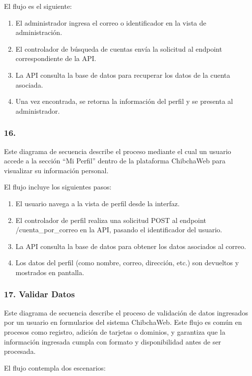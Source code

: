 El flujo es el siguiente:

\begin{enumerate}
    \item El administrador ingresa el correo o identificador en la vista de administración.
    \item El controlador de búsqueda de cuentas envía la solicitud al endpoint correspondiente de la API.
    \item La API consulta la base de datos para recuperar los datos de la cuenta asociada.
    \item Una vez encontrada, se retorna la información del perfil y se presenta al administrador.
\end{enumerate}

\subsubsection*{16. }

Este diagrama de secuencia describe el proceso mediante el cual un usuario accede a la sección “Mi Perfil” dentro de la plataforma ChibchaWeb para visualizar su información personal.

El flujo incluye los siguientes pasos:

\begin{enumerate}
\item El usuario navega a la vista de perfil desde la interfaz.
\item El controlador de perfil realiza una solicitud POST al endpoint /cuenta\_por\_correo en la API, pasando el identificador del usuario.
\item La API consulta la base de datos para obtener los datos asociados al correo.
\item Los datos del perfil (como nombre, correo, dirección, etc.) son devueltos y mostrados en pantalla.
\end{enumerate}

\subsubsection*{17. Validar Datos}

Este diagrama de secuencia describe el proceso de validación de datos ingresados por un usuario en formularios del sistema ChibchaWeb. Este flujo es común en procesos como registro, adición de tarjetas o dominios, y garantiza que la información ingresada cumpla con formato y disponibilidad antes de ser procesada.

El flujo contempla dos escenarios:

